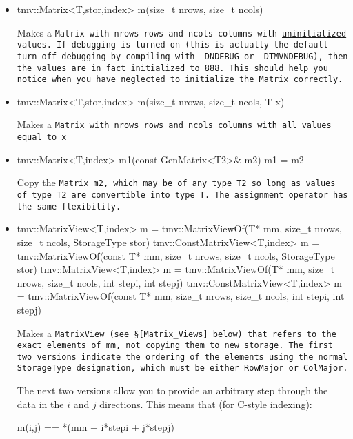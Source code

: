 \begin{itemize}
\item 
\begin{tmvcode}
tmv::Matrix<T,stor,index> m(size_t nrows, size_t ncols)
\end{tmvcode}
Makes a \tt{Matrix} with \tt{nrows} rows and \tt{ncols} columns with 
\underline{uninitialized} values.
If debugging is turned on (this is actually the default -
turn off debugging by compiling
with \tt{-DNDEBUG} or \tt{-DTMVNDEBUG}), then the values are in fact initialized to 888.  
This should help you notice
when you have neglected to initialize the \tt{Matrix} correctly.

\item
\begin{tmvcode}
tmv::Matrix<T,stor,index> m(size_t nrows, size_t ncols, T x)
\end{tmvcode}
Makes a \tt{Matrix} with \tt{nrows} rows and \tt{ncols} columns with all 
values equal to \tt{x}

\item
\begin{tmvcode}
tmv::Matrix<T,index> m1(const GenMatrix<T2>& m2)
m1 = m2
\end{tmvcode}
Copy the \tt{Matrix m2}, which may be of any type \tt{T2} so long
as values of type \tt{T2} are convertible into type \tt{T}.
The assignment operator has the same flexibility.

\item
\begin{tmvcode}
tmv::MatrixView<T,index> m = 
      tmv::MatrixViewOf(T* mm, size_t nrows, size_t ncols, 
      StorageType stor)
tmv::ConstMatrixView<T,index> m = 
      tmv::MatrixViewOf(const T* mm,  size_t nrows, size_t ncols, 
      StorageType stor)
tmv::MatrixView<T,index> m = 
      tmv::MatrixViewOf(T* mm, size_t nrows, size_t ncols, 
      int stepi, int stepj)
tmv::ConstMatrixView<T,index> m = 
      tmv::MatrixViewOf(const T* mm,  size_t nrows, size_t ncols, 
      int stepi, int stepj)
\end{tmvcode}
Makes a \tt{MatrixView} (see \S\ref{Matrix_Views} below) that refers to the exact
elements of \tt{mm}, not copying them to new storage.  The first two versions
indicate the ordering of the elements using the normal \tt{StorageType}
designation, which must be either \tt{RowMajor} or \tt{ColMajor}.
  
The next two versions allow you to provide an arbitrary step through
the data in the $i$ and $j$ directions.  This means that (for C-style indexing):
\begin{tmvcode}
m(i,j) == *(mm + i*stepi + j*stepj)
\end{tmvcode}


\end{itemize}
